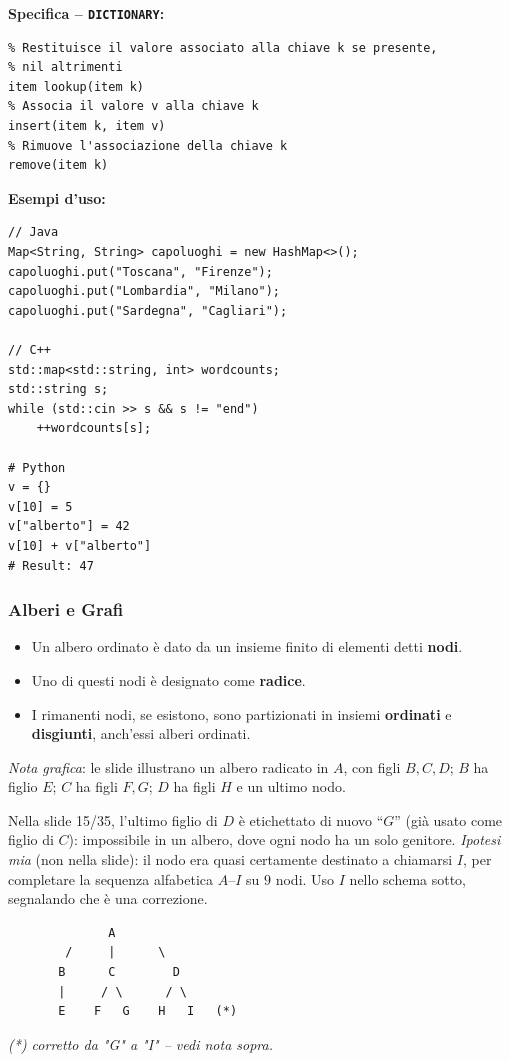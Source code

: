 \documentclass[12pt, a4paper]{article}
\begin{document}
\textbf{Specifica -- \texttt{DICTIONARY}:}
\begin{verbatim}
% Restituisce il valore associato alla chiave k se presente,
% nil altrimenti
item lookup(item k)
% Associa il valore v alla chiave k
insert(item k, item v)
% Rimuove l'associazione della chiave k
remove(item k)
\end{verbatim}

\textbf{Esempi d'uso:}
\begin{verbatim}
// Java
Map<String, String> capoluoghi = new HashMap<>();
capoluoghi.put("Toscana", "Firenze");
capoluoghi.put("Lombardia", "Milano");
capoluoghi.put("Sardegna", "Cagliari");

// C++
std::map<std::string, int> wordcounts;
std::string s;
while (std::cin >> s && s != "end")
    ++wordcounts[s];

# Python
v = {}
v[10] = 5
v["alberto"] = 42
v[10] + v["alberto"]
# Result: 47
\end{verbatim}

\subsubsection{Alberi e Grafi}

\begin{tcolorbox}[colback=lightergray!10, colframe=tocsec, title=\textbf{Definizione: Albero Ordinato}]
\label{def:albero-ordinato}
\begin{itemize}
    \item Un albero ordinato è dato da un insieme finito di elementi detti \textbf{nodi}.
    \item Uno di questi nodi è designato come \textbf{radice}.
    \item I rimanenti nodi, se esistono, sono partizionati in insiemi \textbf{ordinati} e \textbf{disgiunti}, anch'essi alberi ordinati.
\end{itemize}
\end{tcolorbox}

\textit{Nota grafica}: le slide illustrano un albero radicato in $A$, con figli $B,C,D$; $B$ ha figlio $E$; $C$ ha figli $F,G$; $D$ ha figli $H$ e un ultimo nodo.
\begin{tcolorbox}[colback=lightergray!5, colframe=tocsubsec, title=\textbf{Refuso nella Slide Originale}]
Nella slide 15/35, l'ultimo figlio di $D$ è etichettato di nuovo ``$G$'' (già usato come figlio di $C$): impossibile in un albero, dove ogni nodo ha un solo genitore. \textit{Ipotesi mia} (non nella slide): il nodo era quasi certamente destinato a chiamarsi $I$, per completare la sequenza alfabetica $A$--$I$ su $9$ nodi. Uso $I$ nello schema sotto, segnalando che è una correzione.
\end{tcolorbox}
\begin{verbatim}
              A
        /     |      \
       B      C        D
       |     / \      / \
       E    F   G    H   I   (*)
\end{verbatim}
\textit{(*) corretto da "G" a "I" -- vedi nota sopra.}
\end{document}
